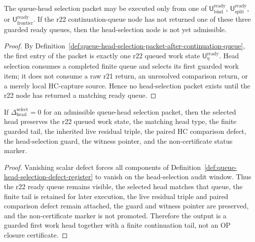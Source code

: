 \begin{lemma}
\label{lem:continuation-queue-output-is-head-selection-precondition}
The queue-head selection packet may be executed only from one of \(\mathsf U_{\mathrm{bind}}^{\mathrm{ready}}\), \(\mathsf U_{\mathrm{split}}^{\mathrm{ready}}\), or \(\mathsf U_{\mathrm{frontier}}^{\mathrm{ready}}\).  If the r22 continuation-queue node has not returned one of these three guarded ready queues, then the head-selection node is not yet admissible.
\end{lemma}

\begin{proof}
By Definition~\ref{def:queue-head-selection-packet-after-continuation-queue}, the first entry of the packet is exactly one r22 queued work state \(\mathsf U_{\eta}^{\mathrm{ready}}\).  Head selection consumes a completed finite queue and selects its first guarded work item; it does not consume a raw r21 return, an unresolved comparison return, or a merely local HC-capture source.  Hence no head-selection packet exists until the r22 node has returned a matching ready queue.
\end{proof}

\begin{lemma}
\label{lem:zero-queue-head-selection-defect-preserves-selected-head-data}
If \(\Delta_{\mathrm{head}}^{\mathrm{select}}=0\) for an admissible queue-head selection packet, then the selected head preserves the r22 queued work state, the matching head type, the finite guarded tail, the inherited live residual triple, the paired HC comparison defect, the head-selection guard, the witness pointer, and the non-certificate status marker.
\end{lemma}

\begin{proof}
Vanishing scalar defect forces all components of Definition~\ref{def:queue-head-selection-defect-register} to vanish on the head-selection audit window.  Thus the r22 ready queue remains visible, the selected head matches that queue, the finite tail is retained for later execution, the live residual triple and paired comparison defect remain attached, the guard and witness pointer are preserved, and the non-certificate marker is not promoted.  Therefore the output is a guarded first work head together with a finite continuation tail, not an OP closure certificate.
\end{proof}

